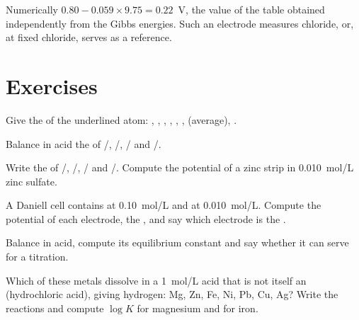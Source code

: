 Numerically $0.80 - 0.059 \times 9.75 = 0.22$~V, the value of the table
obtained independently from the Gibbs energies. Such an electrode
measures chloride, or, at fixed chloride, serves as a reference.

\section{Exercises}

\begin{exercise}[$\star$]\label{exo:b1:nernst:1}
Give the  of the underlined atom: ,
, , ,
, , 
(average), .
\end{exercise}

\begin{exercise}[$\star$]\label{exo:b1:nernst:2}
Balance in acid the  of /,
/, / and /.
\end{exercise}

\begin{exercise}[$\star$]\label{exo:b1:nernst:3}
Write the  of /, /,
/ and /. Compute the potential of a zinc
strip in \qty{0.010}{mol/L} zinc sulfate.
\end{exercise}

\begin{exercise}[$\star$]\label{exo:b1:nernst:4}
A Daniell cell contains  at \qty{0.10}{mol/L} and  at
\qty{0.010}{mol/L}. Compute the potential of each electrode, the , and say which electrode is the .
\end{exercise}

\begin{exercise}[$\star\star$]\label{exo:b1:nernst:5}
Balance  in acid, compute its equilibrium constant and
say whether it can serve for a titration.
\end{exercise}

\begin{exercise}[$\star\star$]\label{exo:b1:nernst:6}
Which of these metals dissolve in a \qty{1}{mol/L} acid that is not
itself an  (hydrochloric acid), giving hydrogen: Mg, Zn, Fe, Ni,
Pb, Cu, Ag? Write the reactions and compute $\log K$ for magnesium and
for iron.
\end{exercise}

